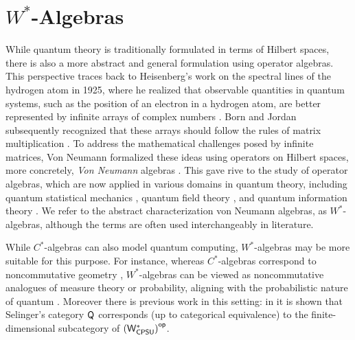 \section{\( W^* \)-Algebras}

 While quantum theory is traditionally formulated in terms of Hilbert spaces, there is also a more abstract and general formulation using operator algebras. This perspective traces back to Heisenberg’s work on the spectral lines of the hydrogen atom in 1925, where he realized that  observable quantities in quantum systems, such as the position of an electron in a hydrogen atom, are better represented by infinite arrays of complex numbers \cite{heisenbergUeberQuantentheoretischeUmdeutung1925}. Born and Jordan subsequently recognized that these arrays should follow the rules of matrix multiplication \cite{bornZurQuantenmechanik1925}. To address the mathematical challenges posed by infinite matrices, Von Neumann formalized these ideas using operators on Hilbert spaces, more concretely, \emph{Von Neumann} algebras \cite{neumann1927wahrscheinlichkeitstheoretischer}. This gave rive to the study of operator algebras, which are now applied in various domains in quantum theory, including quantum statistical mechanics \cite{bratteliOperatorAlgebrasQuantum1987}, quantum field theory \cite{arakiMathematicalTheoryQuantum1999,haagAlgebraicApproachQuantum1964}, and quantum information theory \cite{keylFundamentalsQuantumInformation2002}. We refer to the abstract characterization von Neumann algebras, as $W^*$-algebras, although the terms are often used interchangeably in literature.


 While $C^*$-algebras can also model quantum computing, $W^*$-algebras may be more suitable for this purpose. For instance, whereas $C^*$-algebras correspond to noncommutative geometry \cite{connesNoncommutativeGeometry1995}, $W^*$-algebras can be viewed as noncommutative analogues of measure theory or probability, aligning  with the probabilistic nature of quantum \cite{hamhalterQuantumMeasureTheory2003,HansQuantumProbabilityQuantumInformationTheory10}. Moreover there is previous work in this setting: in \cite{choSemanticsQuantumProgramming2016}  it is shown that Selinger’s category $\mathsf{Q}$ corresponds (up to categorical equivalence) to the finite-dimensional subcategory of $\left(\mathsf{W^*_{CPSU}}\right)^{\mathsf{op}}$.
  
